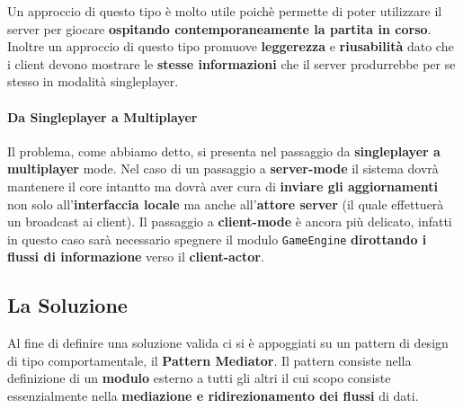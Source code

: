 Un approccio di questo tipo è molto utile poichè permette di poter utilizzare il server per giocare \textbf{ospitando contemporaneamente la partita in corso}. Inoltre un approccio di questo tipo promuove \textbf{leggerezza} e \textbf{riusabilità} dato che i client devono mostrare le \textbf{stesse informazioni} che il server produrrebbe per se stesso in modalità singleplayer.

\paragraph{Da Singleplayer a Multiplayer}
Il problema, come abbiamo detto, si presenta nel passaggio da \textbf{singleplayer a multiplayer} mode. Nel caso di un passaggio a \textbf{server-mode} il sistema dovrà mantenere il core intantto ma dovrà aver cura di \textbf{inviare gli aggiornamenti} non solo all'\textbf{interfaccia locale} ma anche all'\textbf{attore server} (il quale effettuerà un broadcast ai client). Il passaggio a \textbf{client-mode} è ancora più delicato, infatti in questo caso sarà necessario spegnere il modulo \texttt{GameEngine} \textbf{dirottando i flussi di informazione} verso il \textbf{client-actor}.

\subsection{La Soluzione}
Al fine di definire una soluzione valida ci si è appoggiati su un pattern di design di tipo comportamentale, il \textbf{Pattern Mediator}. Il pattern consiste nella definizione di un \textbf{modulo} esterno a tutti gli altri il cui scopo consiste essenzialmente nella \textbf{mediazione e ridirezionamento dei flussi} di dati.

